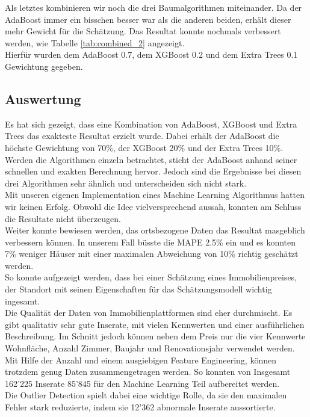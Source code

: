 %
Als letztes kombinieren wir noch die drei Baumalgorithmen miteinander. Da der AdaBoost immer ein bisschen besser war als die anderen beiden, erhält dieser mehr Gewicht für die Schätzung. Das Resultat konnte nochmals verbessert werden, wie Tabelle \ref{tab:combined_2} angezeigt.\\
Hierfür wurden dem AdaBoost 0.7, dem XGBoost 0.2 und dem Extra Trees 0.1  Gewichtung gegeben.
%
\begin{table}[ht]
\centering
{}
\caption{Kombination von AdaBoost, XGBoost und Extra Trees}
\label{tab:combined_2}
\end{table}

%
\subsection{Auswertung}
Es hat sich gezeigt, dass eine Kombination von AdaBoost, XGBoost und Extra Trees das exakteste Resultat erzielt wurde. Dabei erhält der AdaBoost die höchste Gewichtung von 70\%, der XGBoost 20\% und der Extra Trees 10\%.\\
Werden die Algorithmen einzeln betrachtet, sticht der AdaBoost anhand seiner schnellen und exakten Berechnung hervor. Jedoch sind die Ergebnisse bei diesen drei Algorithmen sehr ähnlich und unterscheiden sich nicht stark.\\
Mit unseren eigenen Implementation eines Machine Learning Algorithmus hatten wir keinen Erfolg. Obwohl die Idee vielversprechend aussah, konnten am Schluss die Resultate nicht überzeugen.\\[2ex]
%
Weiter konnte bewiesen werden, das ortsbezogene Daten das Resultat masgeblich verbessern können. In unserem Fall büsste die MAPE 2.5\% ein und es konnten 7\% weniger Häuser mit einer maximalen Abweichung von 10\% richtig geschätzt werden.\\
So konnte aufgezeigt werden, dass bei einer Schätzung eines Immobilienpreises, der Standort mit seinen Eigenschaften für das Schätzungsmodell wichtig ingesamt.\\[2ex]
%
Die Qualität der Daten von Immobilienplattformen sind eher durchmischt. Es gibt qualitativ sehr gute Inserate, mit vielen Kennwerten und einer ausführlichen Beschreibung. Im Schnitt jedoch können neben dem Preis nur die vier Kennwerte Wohnfläche, Anzahl Zimmer, Baujahr und Renovationsjahr verwendet werden.\\
Mit Hilfe der Anzahl und einem ausgiebigen Feature Engineering, können trotzdem genug Daten zusammengetragen werden. So konnten von Insgesamt 162’225 Inserate 85’845 für den Machine Learning Teil aufbereitet werden.\\
Die Outlier Detection spielt dabei eine wichtige Rolle, da sie den maximalen Fehler stark reduzierte, indem sie 12'362 abnormale Inserate aussortierte.\\[2ex]
%
